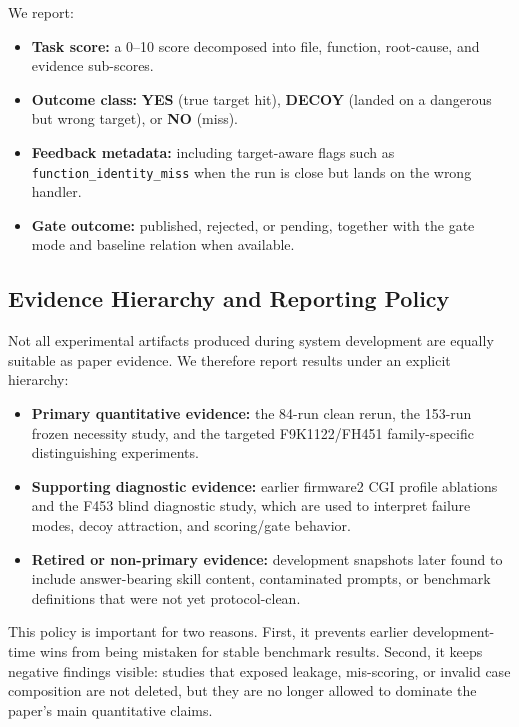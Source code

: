 ﻿\documentclass[preprint,12pt]{elsarticle}
\begin{document}
We report:
\begin{itemize}[leftmargin=*]
    \item \textbf{Task score:} a 0--10 score decomposed into file,
    function, root-cause, and evidence sub-scores.
    \item \textbf{Outcome class:} \textbf{YES} (true target hit),
    \textbf{DECOY} (landed on a dangerous but wrong target), or
    \textbf{NO} (miss).
    \item \textbf{Feedback metadata:} including target-aware flags such as
    \texttt{function\_identity\_miss} when the run is close but lands on the
    wrong handler.
    \item \textbf{Gate outcome:} published, rejected, or pending, together
    with the gate mode and baseline relation when available.
\end{itemize}

\subsection{Evidence Hierarchy and Reporting Policy}

Not all experimental artifacts produced during system development are
equally suitable as paper evidence.  We therefore report results under an
explicit hierarchy:
\begin{itemize}[leftmargin=*]
    \item \textbf{Primary quantitative evidence:} the 84-run clean rerun,
    the 153-run frozen necessity study, and the targeted F9K1122/FH451
    family-specific distinguishing experiments.
    \item \textbf{Supporting diagnostic evidence:} earlier firmware2 CGI
    profile ablations and the F453 blind diagnostic study, which are used
    to interpret failure modes, decoy attraction, and scoring/gate
    behavior.
    \item \textbf{Retired or non-primary evidence:} development snapshots
    later found to include answer-bearing skill content, contaminated
    prompts, or benchmark definitions that were not yet protocol-clean.
\end{itemize}

This policy is important for two reasons.  First, it prevents earlier
development-time wins from being mistaken for stable benchmark results.
Second, it keeps negative findings visible: studies that exposed leakage,
mis-scoring, or invalid case composition are not deleted, but they are no
longer allowed to dominate the paper's main quantitative claims.
\end{document}
